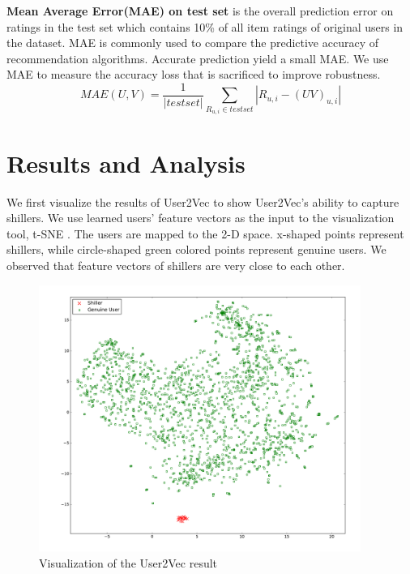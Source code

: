 \documentclass[master,english,final]{kaist-ucs}
\begin{document}
\textbf{Mean Average Error(MAE) on test set} is the overall prediction error on ratings in the test set which contains 10\% of all item ratings of original users in the dataset.
MAE is commonly used to compare the predictive accuracy of recommendation algorithms.
Accurate prediction yield a small MAE.
We use MAE to measure the accuracy loss that is sacrificed to improve robustness.
\begin{equation}
MAE(U,V) = \frac{1}{|test set|} \sum_{R_{u,i} \in test set} |R_{u,i}-(UV)_{u,i}|
\end{equation}

\section{Results and Analysis}
We first visualize the results of User2Vec to show User2Vec's ability to capture shillers.
We use learned users' feature vectors as the input to the visualization tool, t-SNE \cite{TSNE}.
The users are mapped to the 2-D space.
x-shaped points represent shillers, while circle-shaped green colored points represent genuine users.
We observed that feature vectors of shillers are very close to each other.
\begin{figure}[t]
    \centerline{\includegraphics[width=10.5cm]{figure/user2vec_result.pdf}}
    \caption{  Visualization of the User2Vec result } \label{user2vec_result}
\end{figure}

\end{document}

